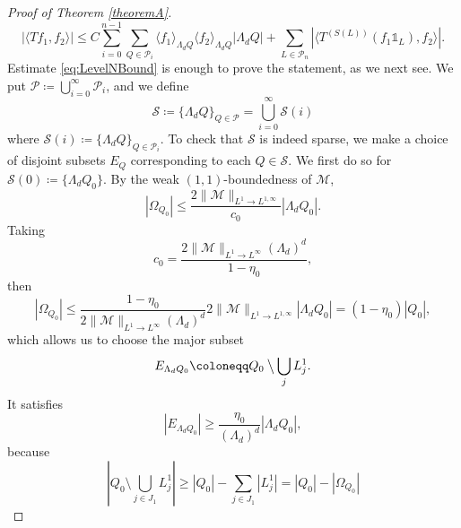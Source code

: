 \documentclass[12pt]{amsart}
\newcommand{\R}{\mathbb{R}}
\newcommand{\supp}[1]{\operatorname{supp}\left(#1\right) }
\newcommand{\Ss}{\mathcal{S}}
\theoremstyle{plain}
\theoremstyle{definition} %
\numberwithin{equation}{section}
\begin{document}
\begin{proof}[Proof of Theorem \ref{theoremA}]
\begin{equation}
        |\langle Tf_1,f_2\rangle|
        \leq 
        C\sum_{i=0}^{n-1}\sum_{Q\in\mathcal{P}_i}
        \langle f_1\rangle_{\Lambda_d Q}\langle f_2\rangle_{\Lambda_d Q}|\Lambda_d Q|
        +
        \sum_{L\in \mathcal{P}_{n}}|\langle T^{(S(L))}(f_1\mathds{1}_{L}),f_2\rangle|.
    \end{equation}
Estimate \eqref{eq:LevelNBound} is enough to prove the statement, as we next see. We put $\mathcal{P}\coloneqq \bigcup_{i=0}^{\infty}\mathcal{P}_i$, and we define
\[
\mathcal{S}
\coloneqq 
\{\Lambda_d Q\}_{Q\in \mathcal{P}}
=
\bigcup_{i=0}^{\infty}\mathcal{S}(i)
\]
where $\mathcal{S}(i)\coloneqq \{\Lambda_d Q\}_{Q\in\mathcal{P}_i}$. To check that $\mathcal{S}$ is indeed sparse, we make a choice of disjoint subsets $E_Q$ corresponding to each $Q\in \mathcal{S}$. We first do so for $\Ss(0)\coloneqq\{\Lambda_dQ_0\}$. By the weak $(1,1)$-boundedness of $\mathcal{M}$,
\[
|\Omega_{Q_0}|
\leq 
\frac{2\|\mathcal{M}\|_{L^1\to L^{1,\infty}}}{c_0}|\Lambda_d Q_0|.
\]
Taking 
\[
c_0
=
\frac{2\|\mathcal{M}\|_{L^1\to L^{\infty}}(\Lambda_d)^d}{1-\eta_0},
\]
then 
\[
|\Omega_{Q_0}|
\leq
\frac{1-\eta_0}{2\|\mathcal{M}\|_{L^1\to L^{\infty}}(\Lambda_d)^d}
2\|\mathcal{M}\|_{L^1\to L^{1,\infty}}|\Lambda_d Q_0|
=
(1-\eta_0)|Q_0|,
\]
which allows us to choose the major subset
\[
    E_{\Lambda_dQ_0}
    \coloneqq 
    Q_0\mathbin{\big\backslash}{\bigcup_{j} L_j^{1}}.
\]
It satisfies 
\[
\left|E_{\Lambda_dQ_0}\right| 
\geq
\frac{\eta_0}{(\Lambda_d)^d}|\Lambda_d Q_0|,
\]
because
\[
    \left|
    Q_0\setminus{\bigcup_{j\in J_1} L_j^1}
    \right|
    \geq 
    |Q_0|-\sum_{j\in J_1}|L_j^1|
    =
    |Q_0|-|\Omega_{Q_0}|
\]
\end{proof}
\end{document}
